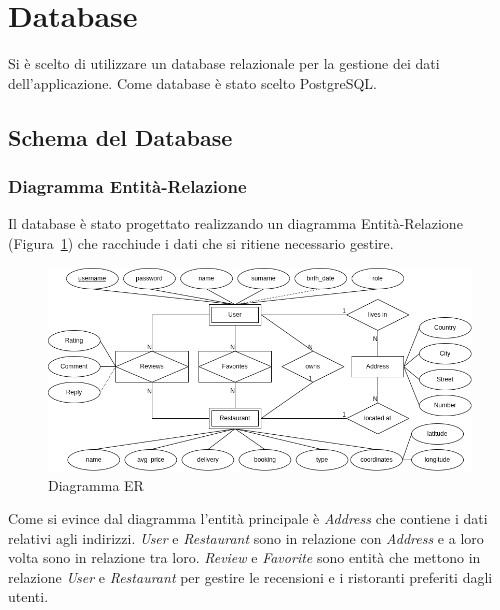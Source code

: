 \section{Database}
Si è scelto di utilizzare un database relazionale per 
la gestione dei dati dell'applicazione.
Come database è stato scelto PostgreSQL.

\subsection{Schema del Database}
\subsubsection{Diagramma Entità-Relazione}
Il database è stato progettato realizzando un 
diagramma Entità-Relazione (Figura~\ref{fig:er-diagram}) che racchiude i dati che si ritiene 
necessario gestire.
\begin{figure}[H]
  \centering
  \includegraphics[width=\textwidth]{images/ER-base.png}
  \caption{Diagramma ER}
  \label{fig:er-diagram}
\end{figure}
Come si evince dal diagramma l'entità principale 
è \textit{Address} che contiene i dati relativi agli indirizzi. 
\textit{User} e \textit{Restaurant} sono in relazione con \textit{Address} 
e a loro volta sono in relazione tra loro.
\textit{Review} e \textit{Favorite} sono entità che mettono in 
relazione  
\textit{User} e \textit{Restaurant} per gestire le recensioni
e i ristoranti preferiti dagli utenti.
